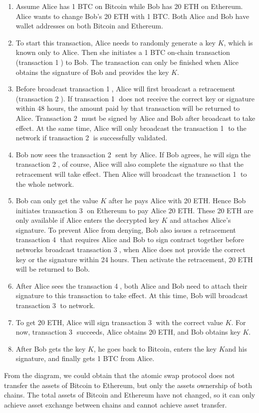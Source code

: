 \begin{enumerate}
  \item Assume Alice has 1 BTC on Bitcoin while Bob has 20 ETH on Ethereum. Alice wants to change Bob's 20 ETH with 1 BTC. Both Alice and Bob have wallet addresses on both Bitcoin and Ethereum.
    \item To start this transaction, Alice needs to randomly generate a key $K$, which is known only to Alice. Then she initiates a 1 BTC on-chain transaction (transaction \textcircled{1}) to Bob. The transaction can only be finished when Alice obtains the signature of Bob and provides the key $K$.
    \item Before broadcast transaction \textcircled{1}, Alice will first broadcast a retracement (transaction \textcircled{2}). If transaction \textcircled{1} does not receive the correct key or signature within 48 hours, the amount paid by that transaction will be returned to Alice. Transaction \textcircled{2} must be signed by Alice and Bob after broadcast to take effect. At the same time, Alice will only broadcast the transaction \textcircled{1} to the network if transaction \textcircled{2} is successfully validated.
    \item Bob now sees the transaction \textcircled{2} sent by Alice. If Bob agrees, he will sign the transaction \textcircled{2}, of course, Alice will also complete the signature so that the retracement will take effect. Then Alice will broadcast the transaction \textcircled{1} to the whole network.
    \item Bob can only get the value $K$ after he pays Alice with 20 ETH. Hence Bob initiates transaction \textcircled{3} on Ethereum to pay Alice 20 ETH. These 20 ETH are only available if Alice enters the decrypted key $K$ and attaches Alice's signature. To prevent Alice from denying, Bob also issues a retracement transaction \textcircled{4} that requires Alice and Bob to sign contract together before networks broadcast transaction \textcircled{3}, when Alice does not provide the correct key or the signature within 24 hours. Then activate the retracement, 20 ETH will be returned to Bob.
    \item After Alice sees the transaction \textcircled{4}, both Alice and Bob need to attach their signature to this transaction to take effect. At this time, Bob will broadcast transaction \textcircled{3} to network.
    \item To get 20 ETH, Alice will sign transaction \textcircled{3} with the correct value $K$. For now, transaction \textcircled{3} succeeds, Alice obtains 20 ETH, and Bob obtains key $K$.
    \item After Bob gets the key $K$, he goes back to Bitcoin, enters the key $K $and his signature, and finally gets 1 BTC from Alice.
\end{enumerate}
\noindent From the diagram, we could obtain that the atomic swap protocol does not transfer the assets of Bitcoin to Ethereum, but only the assets ownership of both chains. The total assets of Bitcoin and Ethereum have not changed, so it can only achieve asset exchange between chains and cannot achieve asset transfer.\\

